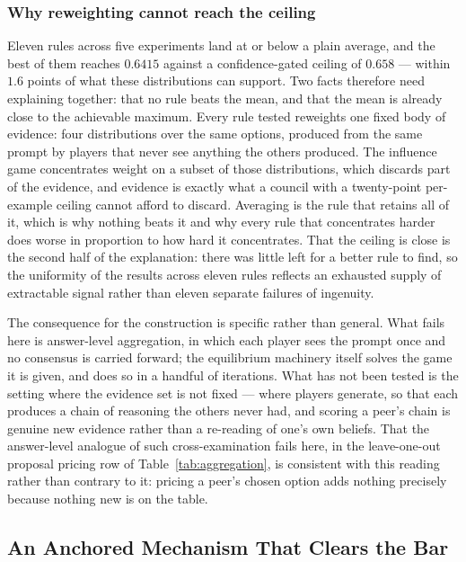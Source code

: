 \subsubsection{Why reweighting cannot reach the ceiling}

Eleven rules across five experiments land at or below a plain average, and the
best of them reaches $0.6415$ against a confidence-gated ceiling of $0.658$ ---
within $1.6$ points of what these distributions can support. Two facts therefore
need explaining together: that no rule beats the mean, and that the mean is
already close to the achievable maximum. Every rule tested reweights one fixed body of evidence: four
distributions over the same options, produced from the same prompt by players
that never see anything the others produced. The influence game concentrates
weight on a subset of those distributions, which discards part of the evidence,
and evidence is exactly what a council with a twenty-point per-example ceiling
cannot afford to discard. Averaging is the rule that retains all of it, which is
why nothing beats it and why every rule that concentrates harder does worse in
proportion to how hard it concentrates. That the ceiling is close is the second
half of the explanation: there was little left for a better rule to find, so the
uniformity of the results across eleven rules reflects an exhausted supply of
extractable signal rather than eleven separate failures of ingenuity.

The consequence for the construction is specific rather than general. What fails
here is answer-level aggregation, in which each player sees the prompt once and
no consensus is carried forward; the equilibrium machinery itself solves the game
it is given, and does so in a handful of iterations. What has not been tested is
the setting where the evidence set is not fixed --- where players generate, so
that each produces a chain of reasoning the others never had, and scoring a
peer's chain is genuine new evidence rather than a re-reading of one's own
beliefs. That the answer-level analogue of such cross-examination fails here, in
the leave-one-out proposal pricing row of Table~\ref{tab:aggregation}, is
consistent with this reading rather than contrary to it: pricing a peer's chosen
option adds nothing precisely because nothing new is on the table.

\subsection{An Anchored Mechanism That Clears the Bar}
\label{sec:results:anchored}


